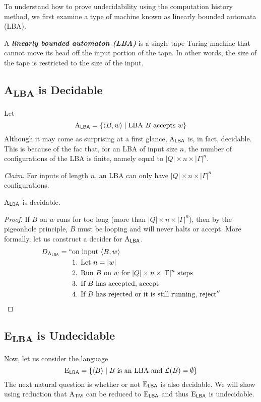To understand how to prove undecidability using the computation history method, we first examine a type of machine known as linearly bounded automata (LBA).

\begin{definition}
    A \textit{\textbf{linearly bounded automaton (LBA)}} is a single-tape Turing machine that cannot move its head off the input portion of the tape. In other words, the size of the tape is restricted to the size of the input.
\end{definition}

\subsection{A\textsubscript{LBA} is Decidable}

Let
$$
\mathrm{A}_{\mathsf{LBA}} = \{ \langle B,w \rangle \mid \text{LBA $B$ accepts $w$} \}
$$
Although it may come as surprising at a first glance, $\mathrm{A}_{\mathsf{LBA}}$ is, in fact, decidable. This is because of the fac that, for an LBA of input size $n$, the number of configurations of the LBA is finite, namely equal to $|Q| \times n \times |\Gamma|^n$.

\textit{Claim}. For inputs of length $n$, an LBA can only have $|Q| \times n \times |\Gamma|^n$ configurations.

\begin{theorem}
    $\mathrm{A}_{\mathsf{LBA}}$ is decidable.
\end{theorem}

\begin{proof}
    If $B$ on $w$ runs for too long (more than $|Q| \times n \times |\Gamma|^n$), then by the pigeonhole principle, $B$ must be looping and will never halts or accept. More formally, let us construct a decider for $\mathrm{A}_{\mathsf{LBA}}$.
    $$
    \begin{aligned}
        D_{\mathrm{A}_{\mathsf{LBA}}} = 
            `` &\text{on input $\langle B,w \rangle$} \\
            &\text{1. Let $n = |w|$} \\
            &\text{2. Run $B$ on $w$ for $|Q| \times n \times |\Gamma|^n$ steps} \\
            &\text{3. If $B$ has accepted, accept} \\
            &\text{4. If $B$ has rejected or it is still running, reject}
            ''
    \end{aligned}
    $$
\end{proof}

\subsection{E\textsubscript{LBA} is Undecidable}
Now, let us consider the language
$$
\mathrm{E}_{\mathsf{LBA}} = \{ \langle B \rangle \mid \text{$B$ is an LBA and $\mathcal{L}(B) = \emptyset$} \}
$$
The next natural question is whether or not $\mathrm{E}_{\mathsf{LBA}}$ is also decidable. We will show using reduction that $\mathrm{A}_{\mathsf{TM}}$ can be reduced to $\mathrm{E}_{\mathsf{LBA}}$ and thus $\mathrm{E}_{\mathsf{LBA}}$ is undecidable.

